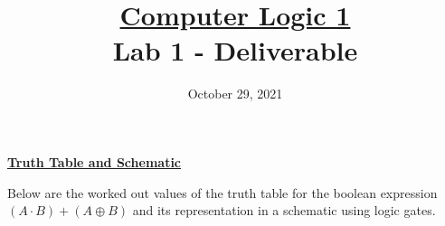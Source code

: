 \documentclass[a4paper]{article}
\title{\underline{Computer Logic 1}\\ {\small Lab 1 - Deliverable}}
\date{October 29, 2021}
\begin{document}
\maketitle
\hr
\newpage


\vspace*{\fill}
\begin{center}
  {\Huge\textbf{\underline{Truth Table and Schematic}}}
\end{center}
\vspace*{\fill}
\newpage

Below are the worked out values of the truth table for the boolean expression $(A \cdot B) + (A \oplus B)$ and its representation in a schematic using logic gates.\\

~\\~\\~\\~\\
~\\~\\~\\~\\
~\\~\\~\\~\\
\end{document}
